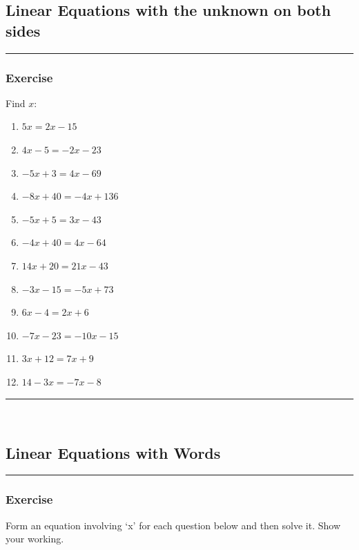\documentclass[a4paper,12pt]{article}
\newcommand\question{
	 \rule[0pt]{17cm}{0.5pt}\vspace{-0.5cm}
	\subsubsection{Exercise}

}
\newcommand\questionend{
	\rule[0pt]{17cm}{0.5pt}\vspace{0.0cm}\\
}
\begin{document}
\subsection{Linear Equations with the unknown on both sides}
\question
Find $x$:
\begin{multicols}{2}
\begin{enumerate}[label=\normalsize \alph*)~~~]
\item $5x = 2x - 15$
\item $4x - 5 = -2x - 23$
\item $-5x + 3 = 4x - 69$
\item $-8x + 40 = -4x + 136$
\item $-5x+5 = 3x-43$
\item $-4x + 40 = 4x - 64$
\item $14x + 20 = 21x - 43$
\item $-3x -15 = - 5x + 73$
\item $6x -4 = 2x + 6$
\item $-7x - 23 = -10x - 15$
\item $3x + 12 = 7x + 9$
\item $14 - 3x = -7x - 8$
\end{enumerate}
\end{multicols}
\questionend
\newpage
\subsection{Linear Equations with Words}
\question
Form an equation involving ‘x’ for each question below and then solve it. Show your working.
\end{document}
